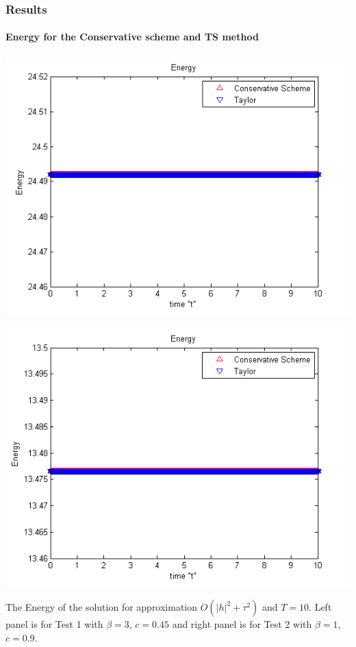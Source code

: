 \documentclass{beamer}
\begin{document}
\begin{frame}
\frametitle{Results}
\framesubtitle{Energy for the Conservative scheme and TS method}

\begin{center}\vspace{0.4cm}
	\begin{minipage}[b]{0.49\linewidth}
		\includegraphics[width=\linewidth]{../amitans/figures/Energy_bt3_c045_h005.png}
	\end{minipage}	
	\begin{minipage}[b]{0.49\linewidth}
		\includegraphics[width=\linewidth]{../amitans/figures/Energy_bt1_c090_h010.png}
		
	\end{minipage}
\end{center}
The Energy of the solution for approximation $O(|h|^2 + \tau^2)$ and $T = 10$. Left panel is for Test 1 with $\beta=3$, $c = 0.45$ and right panel is for Test 2 with $\beta=1$, $c = 0.9$.
\end{frame}
\end{document}
